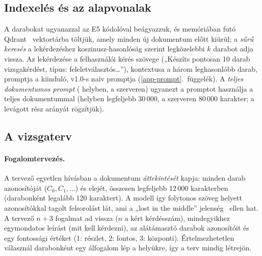 \subsection{Indexelés és az alapvonalak}
\label{sec:alapvonalak}

A darabokat ugyanazzal az E5 kódolóval beágyazzuk, és memóriában futó Qdrant~\cite{qdrant2024}
vektortárba töltjük, amely minden új dokumentum előtt kiürül; a \emph{sűrű keresés} a lekérdezéshez
koszinusz-hasonlóság szerint legközelebbi $k$ darabot adja vissza. Az  lekérdezése a felhasználói
kérés szövege („Készíts pontosan 10 darab vizsgakérdést, típus: feleletválasztós\ldots”), kontextusa a
három leghasonlóbb darab, promptja a \Mimir{} kiinduló, v1.0-s naiv promptja (\ref{app-prompt}.~függelék).
A \emph{teljes dokumentumos prompt} ( helyben,  a szerveren) ugyanezt a promptot
használja a teljes dokumentummal (helyben legfeljebb 30\,000, a szerveren 80\,000 karakter; a levágott
rész arányát rögzítjük).

\subsection{A vizsgaterv}
\label{sec:blueprint}

\paragraph{Fogalomtervezés.} A tervező egyetlen hívásban a dokumentum \emph{áttekintését} kapja: minden
darab azonosítóját ($C_0, C_1,\dots$) és elejét, összesen legfeljebb 12\,000 karakterben (darabonként
legalább 120 karaktert). A modell így folytonos szöveg helyett azonosítókkal tagolt felsorolást lát, ami a
„lost in the middle” jelenség~\cite{liu2024lost} ellen hat. A tervező $n+3$ fogalmat ad vissza ($n$ a
kért kérdésszám), mindegyikhez egymondatos leírást (mit kell kérdezni), az alátámasztó darabok
azonosítóit és egy fontossági értéket (1: részlet, 2: fontos, 3: központi). Értelmezhetetlen válasznál
darabonként egy álfogalom lép a helyükre, így a terv mindig létrejön.


